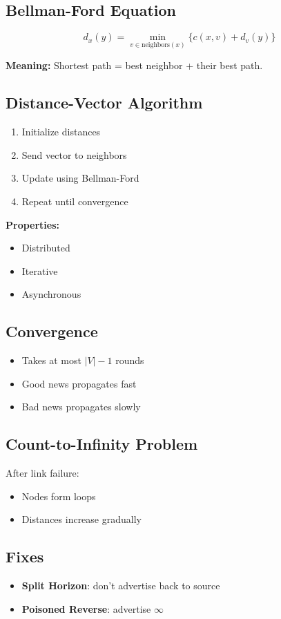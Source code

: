 \documentclass[11pt]{article}
\begin{document}
\subsection{Bellman-Ford Equation}
\[
d_x(y) = \min_{v \in \text{neighbors}(x)} \{ c(x,v) + d_v(y) \}
\]

\textbf{Meaning:}
Shortest path = best neighbor + their best path.

\subsection{Distance-Vector Algorithm}
\begin{enumerate}
    \item Initialize distances
    \item Send vector to neighbors
    \item Update using Bellman-Ford
    \item Repeat until convergence
\end{enumerate}

\textbf{Properties:}
\begin{itemize}
    \item Distributed
    \item Iterative
    \item Asynchronous
\end{itemize}

\subsection{Convergence}
\begin{itemize}
    \item Takes at most $|V| - 1$ rounds
    \item Good news propagates fast
    \item Bad news propagates slowly
\end{itemize}

\subsection{Count-to-Infinity Problem}
After link failure:
\begin{itemize}
    \item Nodes form loops
    \item Distances increase gradually
\end{itemize}

\subsection{Fixes}
\begin{itemize}
    \item \textbf{Split Horizon}: don't advertise back to source
    \item \textbf{Poisoned Reverse}: advertise $\infty$
\end{itemize}
\end{document}
